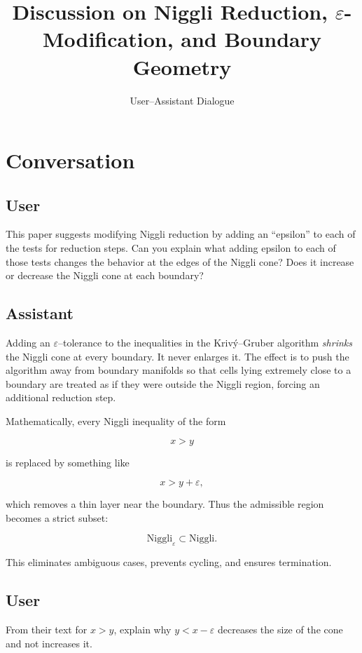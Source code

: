 \documentclass[12pt]{article}
\begin{document}
	
	\title{Discussion on Niggli Reduction, $\varepsilon$-Modification, and Boundary Geometry}
	\author{User--Assistant Dialogue}
	\date{}
	\maketitle
	
	\section*{Conversation}
	
	\subsection*{User}
	This paper suggests modifying Niggli reduction by adding an ``epsilon'' to each of the tests for reduction steps.  
	Can you explain what adding epsilon to each of those tests changes the behavior at the edges of the Niggli cone?  
	Does it increase or decrease the Niggli cone at each boundary?
	
	\subsection*{Assistant}
	Adding an $\varepsilon$--tolerance to the inequalities in the Krivý--Gruber algorithm \emph{shrinks} the Niggli cone at every boundary.  
	It never enlarges it.  
	The effect is to push the algorithm away from boundary manifolds so that cells lying extremely close to a boundary are treated as if they were outside the Niggli region, forcing an additional reduction step.
	
	Mathematically, every Niggli inequality of the form
	
	
	\[
	x > y
	\]
	
	
	is replaced by something like
	
	
	\[
	x > y + \varepsilon,
	\]
	
	
	which removes a thin layer near the boundary.  
	Thus the admissible region becomes a strict subset:
	
	
	\[
	\text{Niggli}_\varepsilon \subset \text{Niggli}.
	\]
	
	
	
	This eliminates ambiguous cases, prevents cycling, and ensures termination.
	
	\subsection*{User}
	From their text for $x > y$, explain why $y < x - \varepsilon$ decreases the size of the cone and not increases it.
	
\end{document}
